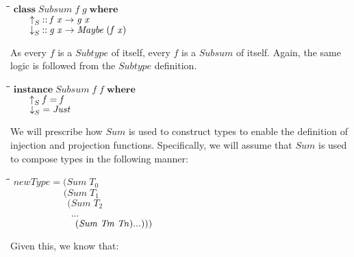\documentclass[11pt]{article}
\newlength{\lwidth}\setlength{\lwidth}{4.5cm}
\newlength{\cwidth}\setlength{\cwidth}{8mm} %
\newcommand{\Conid}[1]{\mathit{#1}}
\newcommand{\Varid}[1]{\mathit{#1}}
\begin{document}
\begin{tabbing}
\qquad\=\hspace{\lwidth}\=\hspace{\cwidth}\=\+\kill
${\mathbf{class}\;\Conid{Subsum}\;\Varid{f}\;\Varid{g}\;\mathbf{where}}$\\
${\hskip2.00em\relax\Varid{\uparrow}_{S}\mathbin{::}\Varid{f}\;\Varid{x}\to \Varid{g}\;\Varid{x}}$\\
${\hskip2.00em\relax\Varid{\downarrow}_{S}\mathbin{::}\Varid{g}\;\Varid{x}\to \Conid{Maybe}\;(\Varid{f}\;\Varid{x})}$
\end{tabbing}
As every \ensuremath{\Varid{f}} is a \ensuremath{\Conid{Subtype}} of itself, every \ensuremath{\Varid{f}} is a \ensuremath{\Conid{Subsum}} of
itself.  Again, the same logic is followed from the \ensuremath{\Conid{Subtype}}
definition.

\begin{tabbing}
\qquad\=\hspace{\lwidth}\=\hspace{\cwidth}\=\+\kill
${\mathbf{instance}\;\Conid{Subsum}\;\Varid{f}\;\Varid{f}\;\mathbf{where}}$\\
${\hskip2.00em\relax\Varid{\uparrow}_{S}\;\Varid{f}\mathrel{=}\Varid{f}}$\\
${\hskip2.00em\relax\Varid{\downarrow}_{S}\mathrel{=}\Conid{Just}}$
\end{tabbing}
We will prescribe how \ensuremath{\Conid{Sum}} is used to construct types to enable the
definition of injection and projection functions.  Specifically, we
will assume that \ensuremath{\Conid{Sum}} is used to compose types in the following
manner:

\begin{tabbing}
\qquad\=\hspace{\lwidth}\=\hspace{\cwidth}\=\+\kill
${\Varid{newType}\mathrel{=}(\Conid{Sum}\;\Varid{T}_{0}}$\\
${\phantom{\Varid{newType}\mathrel{=}(\mbox{}}(\Conid{Sum}\;\Varid{T}_{1}}$\\
${\phantom{\Varid{newType}\mathrel{=}(\mbox{}}\phantom{(\mbox{}}(\Conid{Sum}\;\Varid{T}_{2}}$\\
${\phantom{\Varid{newType}\mathrel{=}(\mbox{}}\phantom{(\mbox{}}\phantom{(\mbox{}}\mathbin{...}}$\\
${\phantom{\Varid{newType}\mathrel{=}(\mbox{}}\phantom{(\mbox{}}\phantom{(\mbox{}}\hskip0.50em\relax(\Conid{Sum}\;\Conid{Tm}\;\Conid{Tn})\mathbin{...})))}$
\end{tabbing}
Given this, we know that:
\end{document}
